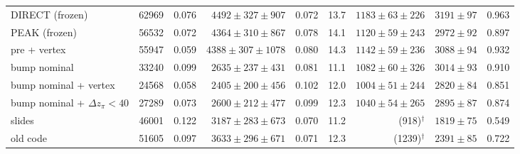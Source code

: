 \begin{table}[H]
\begin{tabular}{lrrrrrrrr}
DIRECT (frozen) & 62969 & 0.076 & $4492\pm327\pm907$ & 0.072 & 13.7 & $1183\pm63\pm226$ & $3191\pm97$ & 0.963 \\
PEAK (frozen) & 56532 & 0.072 & $4364\pm310\pm867$ & 0.078 & 14.1 & $1120\pm59\pm243$ & $2972\pm92$ & 0.897 \\
pre + vertex & 55947 & 0.059 & $4388\pm307\pm1078$ & 0.080 & 14.3 & $1142\pm59\pm236$ & $3088\pm94$ & 0.932 \\
\midrule
bump nominal & 33240 & 0.099 & $2635\pm237\pm431$ & 0.081 & 11.1 & $1082\pm60\pm326$ & $3014\pm93$ & 0.910 \\
bump nominal + vertex & 24568 & 0.058 & $2405\pm200\pm456$ & 0.102 & 12.0 & $1004\pm51\pm244$ & $2820\pm84$ & 0.851 \\
bump nominal + $\Delta z_\pi<40$ & 27289 & 0.073 & $2600\pm212\pm477$ & 0.099 & 12.3 & $1040\pm54\pm265$ & $2895\pm87$ & 0.874 \\
\midrule
slides & 46001 & 0.122 & $3187\pm283\pm673$ & 0.070 & 11.2 & (918)$^\dagger$ & $1819\pm75$ & 0.549 \\
old code & 51605 & 0.097 & $3633\pm296\pm671$ & 0.071 & 12.3 & (1239)$^\dagger$ & $2391\pm85$ & 0.722 \\
\bottomrule
\end{tabular}
\end{table}
